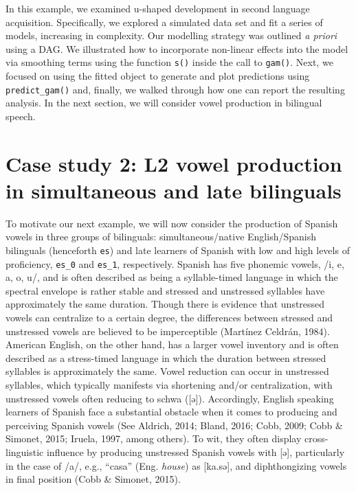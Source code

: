 \documentclass[
  letterpaper,
  DIV=11,
  numbers=noendperiod]{scrartcl}
\begin{document}
In this example, we examined u-shaped development in second language
acquisition. Specifically, we explored a simulated data set and fit a
series of models, increasing in complexity. Our modelling strategy was
outlined \emph{a priori} using a DAG. We illustrated how to incorporate
non-linear effects into the model via smoothing terms using the function
\texttt{s()} inside the call to \texttt{gam()}. Next, we focused on
using the fitted object to generate and plot predictions using
\texttt{predict\_gam()} and, finally, we walked through how one can
report the resulting analysis. In the next section, we will consider
vowel production in bilingual speech.

\section{Case study 2: L2 vowel production in simultaneous and late
bilinguals}\label{case-study-2-l2-vowel-production-in-simultaneous-and-late-bilinguals}

To motivate our next example, we will now consider the production of
Spanish vowels in three groups of bilinguals: simultaneous/native
English/Spanish bilinguals (henceforth \texttt{es}) and late learners of
Spanish with low and high levels of proficiency, \texttt{es\_0} and
\texttt{es\_1}, respectively. Spanish has five phonemic vowels, /i, e,
a, o, u/, and is often described as being a syllable-timed language in
which the spectral envelope is rather stable and stressed and unstressed
syllables have approximately the same duration. Though there is evidence
that unstressed vowels can centralize to a certain degree, the
differences between stressed and unstressed vowels are believed to be
imperceptible (Martínez Celdrán, 1984). American English, on the other
hand, has a larger vowel inventory and is often described as a
stress-timed language in which the duration between stressed syllables
is approximately the same. Vowel reduction can occur in unstressed
syllables, which typically manifests via shortening and/or
centralization, with unstressed vowels often reducing to schwa
({[}ə{]}). Accordingly, English speaking learners of Spanish face a
substantial obstacle when it comes to producing and perceiving Spanish
vowels (See Aldrich, 2014; Bland, 2016; Cobb, 2009; Cobb \& Simonet,
2015; Iruela, 1997, among others). To wit, they often display
cross-linguistic influence by producing unstressed Spanish vowels with
{[}ə{]}, particularly in the case of /a/, e.g., ``casa'' (Eng.
\emph{house}) as {[}ka.sə{]}, and diphthongizing vowels in final
position (Cobb \& Simonet, 2015).
\end{document}
